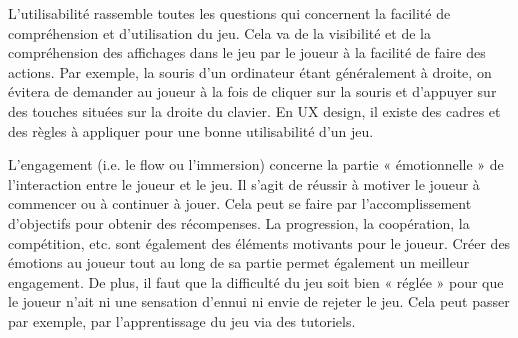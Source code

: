 \documentclass[11pt]{article}
\begin{document}
		L’utilisabilité rassemble toutes les questions qui concernent la facilité de compréhension et d'utilisation du jeu.
		Cela va de la visibilité et de la compréhension des affichages dans le jeu par le joueur à la facilité de faire des actions.
		Par exemple, la souris d’un ordinateur étant généralement à droite, on évitera de demander au joueur à la fois de cliquer sur la souris et d’appuyer sur des touches situées sur la droite du clavier.
		En UX design, il existe des cadres et des règles à appliquer pour une bonne utilisabilité d’un jeu.\par
		L’engagement (i.e. le flow ou l’immersion) concerne la partie « émotionnelle » de l’interaction entre le joueur et le jeu.
		Il s’agit de réussir à motiver le joueur à commencer ou à continuer à jouer.
		Cela peut se faire par l’accomplissement d’objectifs pour obtenir des récompenses.
		La progression, la coopération, la compétition, etc. sont également des éléments motivants pour le joueur.
		Créer des émotions au joueur tout au long de sa partie permet également un meilleur engagement.
		De plus, il faut que la difficulté du jeu soit bien « réglée » pour que le joueur n’ait ni une sensation d’ennui ni envie de rejeter le jeu.
		Cela peut passer par exemple, par l’apprentissage du jeu via des tutoriels.
\end{document}
